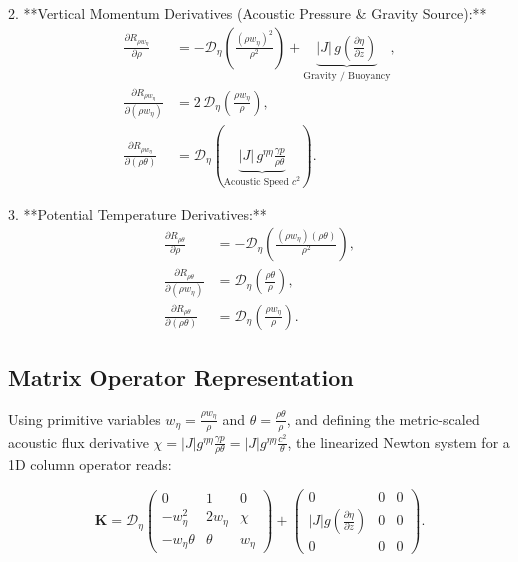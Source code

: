 \documentclass[11pt,a4paper]{article}
\begin{document}
	2. **Vertical Momentum Derivatives (Acoustic Pressure \& Gravity Source):**
	\begin{align}
		\frac{\partial R_{\rho w_\eta}}{\partial \rho} &= -\mathcal{D}_\eta \left( \frac{(\rho w_\eta)^2}{\rho^2} \right) + \underbrace{|J| \, g \left( \frac{\partial \eta}{\partial z} \right)}_{\text{Gravity / Buoyancy}}, \\[6pt]
		\frac{\partial R_{\rho w_\eta}}{\partial (\rho w_\eta)} &= 2 \, \mathcal{D}_\eta \left( \frac{\rho w_\eta}{\rho} \right), \\[6pt]
		\frac{\partial R_{\rho w_\eta}}{\partial (\rho \theta)} &= \mathcal{D}_\eta \left( \underbrace{|J| \, g^{\eta\eta} \frac{\gamma p}{\rho \theta}}_{\text{Acoustic Speed } c^2} \right).
	\end{align}
	
	3. **Potential Temperature Derivatives:**
	\begin{align}
		\frac{\partial R_{\rho \theta}}{\partial \rho} &= -\mathcal{D}_\eta \left( \frac{(\rho w_\eta)(\rho \theta)}{\rho^2} \right), \\[6pt]
		\frac{\partial R_{\rho \theta}}{\partial (\rho w_\eta)} &= \mathcal{D}_\eta \left( \frac{\rho \theta}{\rho} \right), \\[6pt]
		\frac{\partial R_{\rho \theta}}{\partial (\rho \theta)} &= \mathcal{D}_\eta \left( \frac{\rho w_\eta}{\rho} \right).
	\end{align}
	
	
	\subsection{Matrix Operator Representation}
	
	Using primitive variables $w_\eta = \frac{\rho w_\eta}{\rho}$ and $\theta = \frac{\rho \theta}{\rho}$, and defining the metric-scaled acoustic flux derivative $\chi = |J| g^{\eta\eta} \frac{\gamma p}{\rho \theta} = |J| g^{\eta\eta} \frac{c^2}{\theta}$, the linearized Newton system for a 1D column operator reads:
	
	\begin{equation}
		\mathbf{K} = \mathcal{D}_\eta \begin{pmatrix}
			0 & 1 & 0 \\[6pt]
			-w_\eta^2 & 2 w_\eta & \chi \\[6pt]
			-w_\eta \theta & \theta & w_\eta
		\end{pmatrix} 
		+ \begin{pmatrix}
			0 & 0 & 0 \\[6pt]
			|J| g \left(\frac{\partial \eta}{\partial z}\right) & 0 & 0 \\[6pt]
			0 & 0 & 0
		\end{pmatrix}.
	\end{equation}
	
\end{document}
